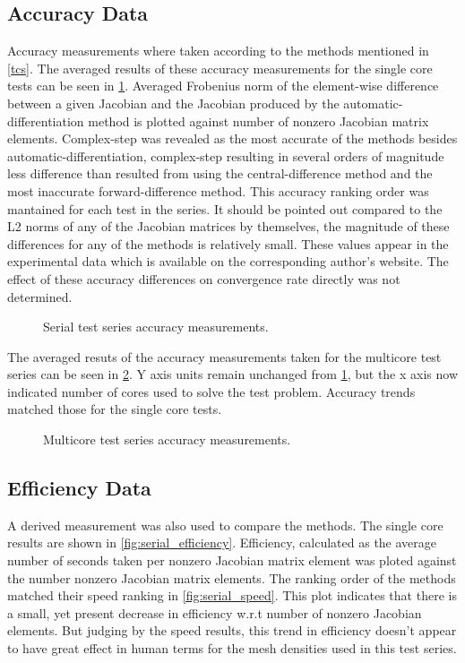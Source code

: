 \documentclass[preprint,12pt]{elsarticle}
\begin{document}
\subsection{Accuracy Data}
Accuracy measurements where taken according to the methods mentioned in \ref{tcs}. The averaged
results of these accuracy measurements for the single core tests can be seen in
\ref{fig:serial_accuracy}. Averaged Frobenius norm of the element-wise difference between a given
Jacobian and the Jacobian produced by the automatic-differentiation method is plotted against number
of nonzero Jacobian matrix elements. Complex-step was revealed as the most accurate of the methods
besides automatic-differentiation, complex-step resulting in several orders of magnitude less
difference than resulted from using the central-difference method and the most inaccurate
forward-difference method. This accuracy ranking order was mantained for each test in the series. It
should be pointed out compared to the L2 norms of any of the Jacobian matrices by themselves, the
magnitude of these differences for any of the methods is relatively small. These values appear in
the experimental data which is available on the corresponding author's website. The effect of these
accuracy differences on convergence rate directly was not determined.

\begin{figure}[tbp]
  \centering
  \scalebox{1.0}{}
  \caption{Serial test series accuracy measurements.}
  \label{fig:serial_accuracy}
\end{figure}

The averaged resuts of the accuracy measurements taken for the multicore test series can be seen in
\ref{fig:multi_accuracy}. Y axis units remain unchanged from \ref{fig:serial_accuracy}, but the x
axis now indicated number of cores used to solve the test problem. Accuracy trends matched those for
the single core tests. 

\begin{figure}[tbp]
  \centering
  \scalebox{1.0}{}
  \caption{Multicore test series accuracy measurements.}
  \label{fig:multi_accuracy}
\end{figure}

\subsection{Efficiency Data}
A derived measurement was also used to compare the methods. The single core results are shown in
\ref{fig:serial_efficiency}. Efficiency, calculated as the average number of seconds taken per nonzero Jacobian matrix element 
was ploted against the number nonzero Jacobian matrix elements. The ranking order of the methods
matched their speed ranking in \ref{fig:serial_speed}. This plot indicates that there is a small,
yet present decrease in efficiency w.r.t number of nonzero Jacobian elements. But judging by the
speed results, this trend in efficiency doesn't appear to have great effect in human terms for the
mesh densities used in this test series.  
\end{document}
